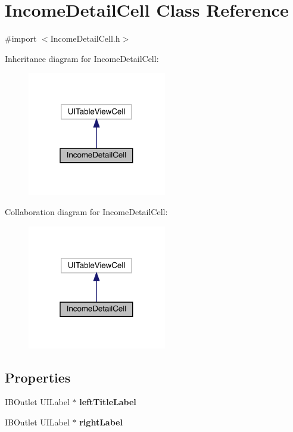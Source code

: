 \hypertarget{interface_income_detail_cell}{}\section{Income\+Detail\+Cell Class Reference}
\label{interface_income_detail_cell}


{\ttfamily \#import $<$Income\+Detail\+Cell.\+h$>$}



Inheritance diagram for Income\+Detail\+Cell\+:\nopagebreak
\begin{figure}[H]
\begin{center}
\leavevmode
\includegraphics[width=172pt]{interface_income_detail_cell__inherit__graph}
\end{center}
\end{figure}


Collaboration diagram for Income\+Detail\+Cell\+:\nopagebreak
\begin{figure}[H]
\begin{center}
\leavevmode
\includegraphics[width=172pt]{interface_income_detail_cell__coll__graph}
\end{center}
\end{figure}
\subsection*{Properties}
\begin{DoxyCompactItemize}
\item 
\mbox{\label{interface_income_detail_cell_aa2aca54ca5d8c2b5e984f7504206ee18}} 
I\+B\+Outlet U\+I\+Label $\ast$ {\bfseries left\+Title\+Label}
\item 
\mbox{\label{interface_income_detail_cell_a9532439e05dc136bf80b4be5c210a673}} 
I\+B\+Outlet U\+I\+Label $\ast$ {\bfseries right\+Label}
\end{DoxyCompactItemize}


